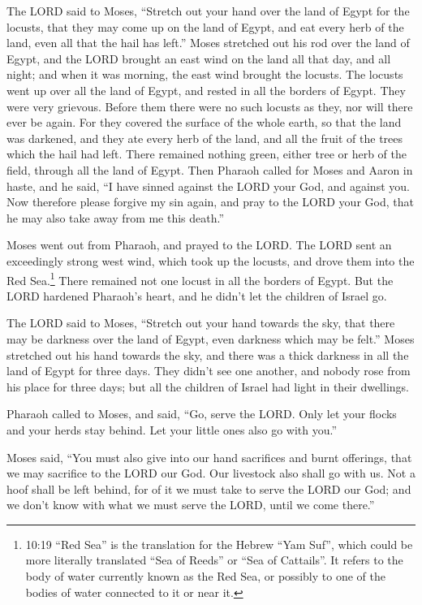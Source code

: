 The LORD said to Moses, ``Stretch out your hand over the
land of Egypt for the locusts, that they may come up on the land of
Egypt, and eat every herb of the land, even all that the hail has
left.''  Moses stretched out his rod over the land of
Egypt, and the LORD brought an east wind on the land all that day, and
all night; and when it was morning, the east wind brought the locusts.
 The locusts went up over all the land of Egypt, and rested
in all the borders of Egypt. They were very grievous. Before them there
were no such locusts as they, nor will there ever be again.
 For they covered the surface of the whole earth, so that
the land was darkened, and they ate every herb of the land, and all the
fruit of the trees which the hail had left. There remained nothing
green, either tree or herb of the field, through all the land of Egypt.
 Then Pharaoh called for Moses and Aaron in haste, and he
said, ``I have sinned against the LORD your God, and against you.
 Now therefore please forgive my sin again, and pray to the
LORD your God, that he may also take away from me this death.''

 Moses went out from Pharaoh, and prayed to the LORD.
 The LORD sent an exceedingly strong west wind, which took
up the locusts, and drove them into the Red Sea.\footnote{10:19 ``Red
  Sea'' is the translation for the Hebrew ``Yam Suf'', which could be
  more literally translated ``Sea of Reeds'' or ``Sea of Cattails''. It
  refers to the body of water currently known as the Red Sea, or
  possibly to one of the bodies of water connected to it or near it.}
There remained not one locust in all the borders of Egypt. 
But the LORD hardened Pharaoh's heart, and he didn't let the children of
Israel go.

 The LORD said to Moses, ``Stretch out your hand towards
the sky, that there may be darkness over the land of Egypt, even
darkness which may be felt.''  Moses stretched out his hand
towards the sky, and there was a thick darkness in all the land of Egypt
for three days.  They didn't see one another, and nobody
rose from his place for three days; but all the children of Israel had
light in their dwellings.

 Pharaoh called to Moses, and said, ``Go, serve the LORD.
Only let your flocks and your herds stay behind. Let your little ones
also go with you.''

 Moses said, ``You must also give into our hand sacrifices
and burnt offerings, that we may sacrifice to the LORD our God.
 Our livestock also shall go with us. Not a hoof shall be
left behind, for of it we must take to serve the LORD our God; and we
don't know with what we must serve the LORD, until we come there.''

